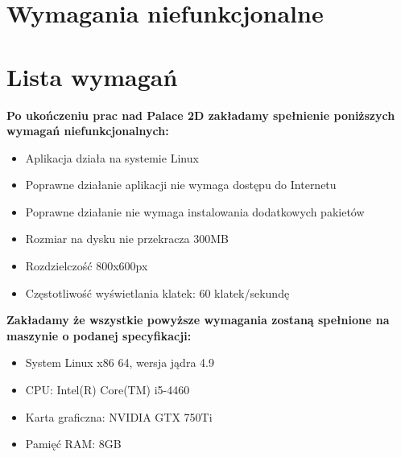 \documentclass{article}
\begin{document}
\section{Wymagania niefunkcjonalne}

\section{Lista wymagań}
\textbf{Po ukończeniu prac nad Palace 2D zakładamy spełnienie poniższych 
wymagań niefunkcjonalnych:}
  \begin{itemize}
  \item Aplikacja działa na systemie Linux
  \item Poprawne działanie aplikacji nie wymaga dostępu do Internetu
  \item Poprawne działanie nie wymaga instalowania dodatkowych pakietów
  \item Rozmiar na dysku nie przekracza 300MB
  \item Rozdzielczość 800x600px
  \item Częstotliwość wyświetlania klatek: 60 klatek/sekundę
  \end{itemize}


\textbf{\newline Zakładamy że wszystkie powyższe wymagania zostaną 
spełnione na maszynie o podanej specyfikacji:}
\begin{itemize}
  \item System Linux x86 64, wersja jądra 4.9
  \item CPU: Intel(R) Core(TM) i5-4460
  \item Karta graficzna: NVIDIA GTX 750Ti
  \item Pamięć RAM: 8GB
\end{itemize}
\end{document}
